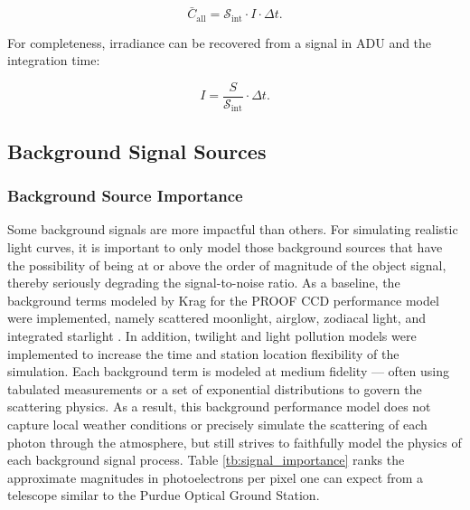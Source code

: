 \begin{equation} \label{eq:irrad_to_count}
  \bar{C}_\mathrm{all} = \mathcal{S}_\mathrm{int} \cdot I \cdot \Delta t.
\end{equation}

For completeness, irradiance can be recovered from a signal in ADU and the integration time:

\begin{equation} \label{eq:count_to_irrad}
  I = \frac{S}{\mathcal{S}_\mathrm{int}} \cdot \Delta t.
\end{equation}

\subsection{Background Signal Sources}

\subsubsection{Background Source Importance}

Some background signals are more impactful than others. For simulating realistic light curves, it is important to only model those background sources that have the possibility of being at or above the order of magnitude of the object signal, thereby seriously degrading the signal-to-noise ratio. As a baseline, the background terms modeled by Krag for the PROOF CCD performance model were implemented, namely scattered moonlight, airglow, zodiacal light, and integrated starlight \cite{krag2003}. In addition, twilight and light pollution models were implemented to increase the time and station location flexibility of the simulation. Each background term is modeled at medium fidelity --- often using tabulated measurements or a set of exponential distributions to govern the scattering physics. As a result, this background performance model does not capture local weather conditions or precisely simulate the scattering of each photon through the atmosphere, but still strives to faithfully model the physics of each background signal process. Table \ref{tb:signal_importance} ranks the approximate magnitudes in photoelectrons per pixel one can expect from a telescope similar to the Purdue Optical Ground Station.

